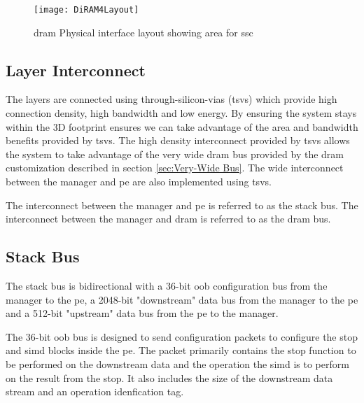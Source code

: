 \begin{figure}[!t]
\centering
\captionsetup{justification=centering}
\captionsetup{width=.9\linewidth}
\centerline{
\mbox{\texttt{[image: DiRAM4Layout]}}
}
\caption{\ac{dram} Physical interface layout showing area for \ac{ssc}}
\label{fig:diram4Layout}
\end{figure}


\subsection{Layer Interconnect}
\label{sec:Layer Interconnect}

The layers are connected using through-silicon-vias (\ac{tsv}s) which provide high connection density, high bandwidth and low energy.
By ensuring the system stays within the 3D footprint ensures we can take advantage of the area and bandwidth benefits provided by \acp{tsv}.
The high density interconnect provided by \acp{tsv} allows the system to take advantage of the very wide \ac{dram} bus provided by the \ac{dram} customization described in section \ref{sec:Very-Wide Bus}.
The wide interconnect between the manager and \ac{pe} are also implemented using \acp{tsv}.

The interconnect between the manager and \ac{pe} is referred to as the stack bus. The interconnect between the manager and \ac{dram} is referred to as the \ac{dram} bus.

\subsection{Stack Bus}
\label{sec:Stack Bus}

The stack bus is bidirectional with a 36-bit \ac{oob} configuration bus from the manager to the \ac{pe}, a 2048-bit "downstream" data bus from the manager to the \ac{pe} and a 512-bit "upstream" data bus from the \ac{pe} to the manager.

The 36-bit \ac{oob} bus is designed to send configuration packets to configure the \ac{stop} and \ac{simd} blocks inside the \ac{pe}.
The packet primarily contains the \ac{stop} function to be performed on the downstream data and the operation the \ac{simd} is to perform on the result from the \ac{stop}.
It also includes the size of the downstream data stream and an operation idenfication tag.

